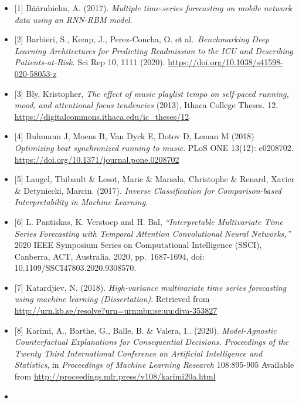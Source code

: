 \documentclass[
  12pt,
]{article}
\providecommand{\tightlist}{%
  \setlength{\itemsep}{0pt}\setlength{\parskip}{0pt}}
\begin{document}
\begin{itemize}
\tightlist
\item
  \protect\hypertarget{1}{}{{[}1{]}} Bäärnhielm, A. (2017).
  \emph{Multiple time-series forecasting on mobile network data using an
  RNN-RBM model}.
\item
  \protect\hypertarget{2}{}{{[}2{]}} Barbieri, S., Kemp, J.,
  Perez-Concha, O. et al.~\emph{Benchmarking Deep Learning Architectures
  for Predicting Readmission to the ICU and Describing
  Patients-at-Risk.} Sci Rep 10, 1111 (2020).
  \url{https://doi.org/10.1038/s41598-020-58053-z}
\item
  \protect\hypertarget{3}{}{{[}3{]}} Bly, Kristopher, \emph{The effect
  of music playlist tempo on self-paced running, mood, and attentional
  focus tendencies} (2013), Ithaca College Theses. 12.
  \url{https://digitalcommons.ithaca.edu/ic_theses/12}
\item
  \protect\hypertarget{4}{}{{[}4{]}} Buhmann J, Moens B, Van Dyck E,
  Dotov D, Leman M (2018) \emph{Optimizing beat synchronized running to
  music}. PLoS ONE 13(12): e0208702.
  \url{https://doi.org/10.1371/journal.pone.0208702}
\item
  \protect\hypertarget{5}{}{{[}5{]}} Laugel, Thibault \& Lesot, Marie \&
  Marsala, Christophe \& Renard, Xavier \& Detyniecki, Marcin. (2017).
  \emph{Inverse Classification for Comparison-based Interpretability in
  Machine Learning}.
\item
  \protect\hypertarget{6}{}{{[}6{]}} L. Pantiskas, K. Verstoep and H.
  Bal, \emph{``Interpretable Multivariate Time Series Forecasting with
  Temporal Attention Convolutional Neural Networks,''} 2020 IEEE
  Symposium Series on Computational Intelligence (SSCI), Canberra, ACT,
  Australia, 2020, pp.~1687-1694, doi: 10.1109/SSCI47803.2020.9308570.
\item
  \protect\hypertarget{7}{}{{[}7{]}} Katardjiev, N. (2018).
  \emph{High-variance multivariate time series forecasting using machine
  learning (Dissertation)}. Retrieved from
  \url{http://urn.kb.se/resolve?urn=urn:nbn:se:uu:diva-353827}
\item
  \protect\hypertarget{8}{}{{[}8{]}} Karimi, A., Barthe, G., Balle, B.
  \& Valera, I.. (2020). \emph{Model-Agnostic Counterfactual
  Explanations for Consequential Decisions. Proceedings of the Twenty
  Third International Conference on Artificial Intelligence and
  Statistics}, in \emph{Proceedings of Machine Learning Research}
  108:895-905 Available from
  \url{http://proceedings.mlr.press/v108/karimi20a.html}
\item

\end{itemize}
\end{document}
